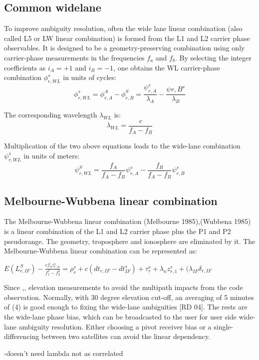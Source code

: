 


\subsection{Common widelane}
To improve ambiguity resolution, often the wide lane linear combination (also called L5 or LW linear combination) is formed from the L1 and L2 carrier phase observables. It is designed to be a geometry-preserving combination using only carrier-phase measurements in the frequencies $f_a$ and $f_b$. By selecting the integer coefficients as $i_A = +1$ and $i_B = -1$, one obtains the WL carrier-phase combination $\phi_{r,WL}^s$ in units of cycles:
\begin{equation}
\phi_{r,WL}^s = \phi_{r,A}^A - \phi_{r,B}^S = \frac{\psi_{r,A}^s}{\lambda_A} - \frac{\psi{r,B}^s}{\lambda_B} \label{eq:wl_cycles}
\end{equation}

The corresponding wavelength $\lambda_{WL}$ is:
\begin{equation}
\lambda_{WL} = \frac{c}{f_A - f_B} 
    \label{eq:wl_wavelength}
\end{equation}

Multiplication of the two above equations leads to the wide-lane combination $\psi_{r,WL}^s$ in units of meters:
\begin{equation}
\psi_{r,WL}^S = \frac{f_A}{f_A-f_B}\psi_{r,A}^s - \frac{f_B}{f_A-f_B}\psi_{r,B}^s
\end{equation}

\subsection{Melbourne-Wubbena linear combination}
The Melbourne-Wubbena linear combination (Melbourne 1985),(Wubbena 1985) is a linear combination of the L1 and L2 carrier phase plus the P1 and P2 pseudorange. The geometry, troposphere and ionosphere are eliminated by it. The Melbourne-Wubbena linear combination can be represented as:

$
E(L_{r,IF}^S) - \frac{cf_2z_{r,w}^s}{f_1^2 - f_2^2} = \rho_r^s + c(dt_{r,IF} - dt_{IF}^s) + \tau_r^s + \lambda_n z_{r,1}^s + (\lambda_{IF}\delta_{r,IF}$

Since ,,%
elevation measurements to avoid the multipath impacts from the code observation. Normally, with
30 degree elevation cut-off, an averaging of 5 minutes of (4) is good enough to fixing the wide-lane
ambiguities [RD 04]. The rests are the wide-lane phase bias, which can be broadcasted to the user for
user side wide-lane ambiguity resolution. Either choosing a pivot receiver bias or a single-differencing
between two satellites can avoid the linear dependency. 


-doesn't need lambda not as correlated